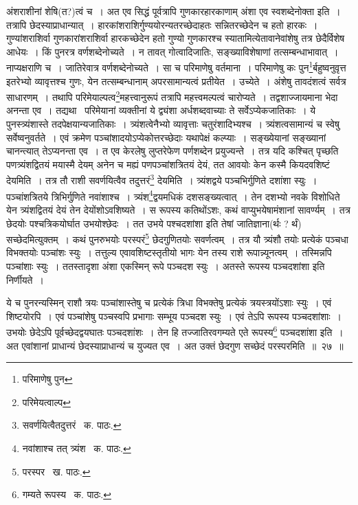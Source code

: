 \documentclass[11pt, openany]{book}
\begin{document}
\noindent अंशराशीनां शेषि(त?)त्वं च~। अत एव सिद्धं पूर्वत्रापि गुणकारहारकाणाम् अंशा एव स्वशब्देनोक्ता इति~। तत्रापि छेदस्याप्राधान्यात्~। हारकांशराशिर्गुण्ययोरन्यतरच्छेदाहतः सन्नितरच्छेदेन च हतो हारकः~। गुण्यांशराशिर्वा गुणकारांशराशिर्वा हारकच्छेदेन हतो गुण्यो गुणकारश्च स्यातामित्येतावानेवांशेषु तत्र छेदैर्विशेष आधेयः~। किं पुनरत्र वर्णशब्देनोच्यते~। न तावत् गोत्वादिजातिः, सङ्ख्याविशेषाणां तत्सम्बन्धाभावात्~। नाप्यक्षराणि च~। जातिरेवात्र वर्णशब्देनोच्यते~। सा च परिमाणेषु वर्तमाना~। परिमाणेषु कः पुन\renewcommand{\thefootnote}{१}\footnote{परिमाणेषु पुन}र्बहुष्वनुवृत्त इतरेभ्यो व्यावृत्तश्च गुणः, येन तत्सम्बन्धानाम् अपरसामान्यत्वं प्रतीयेत~। उच्येते~। अंशेषु तावदंशत्वं सर्वत्र साधारणम्~। तथापि परिमेयाल्पत्व\renewcommand{\thefootnote}{२}\footnote{परिमेयत्वाल्प}महत्त्वानुरूपं तत्रापि महत्त्वमल्पत्वं चारोप्यते~। तद्वशाज्जायमाना भेदा अनन्ता एव~। तद्यथा \textendash\ परिमेयानां व्यक्तीनां ये द्व्यंशा अर्धशब्दवाच्याः ते सर्वेऽप्येकजातिकाः~। ये पुनस्त्र्यंशास्ते तदपेक्षयान्यजातिकाः~। त्र्यंशत्वेनैभ्यो व्यावृत्ताः चतुरंशादिभ्यश्च~। त्र्यंशत्वसामान्यं च स्वेषु सर्वेष्वनुवर्तते~। एवं क्रमेण पञ्चांशादयोऽप्येकोत्तरच्छेदाः यथापेक्षं कल्प्याः~। सङ्ख्येयानां सङ्ख्यानां चानन्त्यात् तेऽप्यनन्ता एव~। त एव केरलेषु लुप्तरेफेण पर्णशब्देन प्रयुज्यन्ते~। तत्र यदि कश्चित् पृच्छति पणत्र्यंशद्वितयं मयास्मै देयम् अनेन च मह्यं पणपञ्चांशत्रितयं देयं, तत आवयोः केन कस्मै कियदवशिष्टं देयमिति~। तत्र तौ राशी सवर्णयित्वैव तदुत्तरं\renewcommand{\thefootnote}{३}\footnote{सवर्णयित्वैतदुत्तरं \textendash\ क. पाठः.} देयमिति~। त्र्यंशद्वये पञ्चभिर्गुणिते दशांशा स्युः~। पञ्चांशत्रितये त्रिभिर्गुणिते नवांशाश्च~। त्र्यंश\renewcommand{\thefootnote}{४}\footnote{नवांशाश्च तत् त्र्यंश \textendash\ क. पाठः.}द्वयमधिकं दशसङ्ख्यत्वात्~। तेन दशभ्यो नवके विशोधिते येन त्र्यंशद्वितयं देयं तेन देयोंशोऽवशिष्यते~। स रूपस्य कतिथोंऽशः, कथं वाप्युभयेषामंशानां सावर्ण्यम्~। तत्र छेदयोः पश्चत्रिकयोर्घात उभयोश्छेदः~। तत उभये पश्चदशांशा इति तेषां जातिज्ञाना(र्थः ? र्थं) सच्छेदमित्युक्तम्~।
कथं पुनरुभयोः परस्परं\renewcommand{\thefootnote}{५}\footnote{परस्पर \textendash\ ख. पाठः.} छेदगुणितयोः सवर्णत्वम्~। तत्र यौ त्र्यंशौ तयोः प्रत्येकं पञ्चधा विभक्तयोः पञ्चांशः स्युः~। तत्तुल्य एवावशिष्टस्तृतीयो भागः येन तस्य राशे रूपान्न्यूनत्वम्~। तस्मिन्नपि पञ्चांशाः स्युः~। ततस्तादृशा अंशा एकस्मिन् रूपे पञ्चदश स्युः~। अतस्ते रूपस्य पञ्चदशांशा इति निर्णीयते~।

\newpage

\noindent ये च पुनरन्यस्मिन् राशौ त्रयः पञ्चांशास्तेषु च प्रत्येकं त्रिधा विभक्तेषु प्रत्येकं त्रयस्त्रयोंऽशाः स्युः~। एवं शिष्टयोरपि~। एवं पञ्चांशेषु
पञ्चस्वपि प्रभागाः सम्भूय पञ्चदश स्युः~। एवं तेऽपि रूपस्य पञ्चदशांशाः~। उभयोः छेदेऽपि पूर्वच्छेदद्वयघातः पञ्चदशांशः~। तेन हि तज्जातिरवगम्यते एते रूपस्य\renewcommand{\thefootnote}{१}\footnote{गम्यते रूपस्य \textendash\ क. पाठः.} पञ्चदशांशा इति~। अत एवांशानां प्राधान्यं छेदस्याप्राधान्यं च युज्यत एव~। अत उक्तं छेदगुण सच्छेदं परस्परमिति~॥~२७~॥\\
\end{document}
